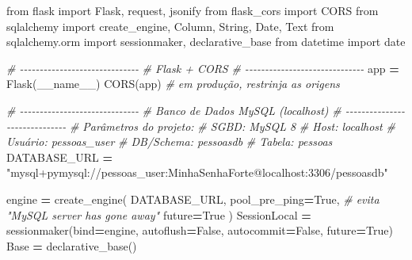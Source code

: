 \documentclass[
]{book}
\newenvironment{Shaded}{\begin{snugshade}}{\end{snugshade}}
\newcommand{\CommentTok}[1]{\textcolor[rgb]{0.56,0.35,0.01}{\textit{#1}}}
\newcommand{\ImportTok}[1]{#1}
\newcommand{\NormalTok}[1]{#1}
\newcommand{\OperatorTok}[1]{\textcolor[rgb]{0.81,0.36,0.00}{\textbf{#1}}}
\newcommand{\StringTok}[1]{\textcolor[rgb]{0.31,0.60,0.02}{#1}}
\newcommand{\VariableTok}[1]{\textcolor[rgb]{0.00,0.00,0.00}{#1}}
\begin{document}
\begin{Shaded}
\begin{Highlighting}[]
\ImportTok{from}\NormalTok{ flask }\ImportTok{import}\NormalTok{ Flask, request, jsonify}
\ImportTok{from}\NormalTok{ flask\_cors }\ImportTok{import}\NormalTok{ CORS}
\ImportTok{from}\NormalTok{ sqlalchemy }\ImportTok{import}\NormalTok{ create\_engine, Column, String, Date, Text}
\ImportTok{from}\NormalTok{ sqlalchemy.orm }\ImportTok{import}\NormalTok{ sessionmaker, declarative\_base}
\ImportTok{from}\NormalTok{ datetime }\ImportTok{import}\NormalTok{ date}

\CommentTok{\# {-}{-}{-}{-}{-}{-}{-}{-}{-}{-}{-}{-}{-}{-}{-}{-}{-}{-}{-}{-}{-}{-}{-}{-}{-}{-}{-}{-}{-}{-}}
\CommentTok{\# Flask + CORS}
\CommentTok{\# {-}{-}{-}{-}{-}{-}{-}{-}{-}{-}{-}{-}{-}{-}{-}{-}{-}{-}{-}{-}{-}{-}{-}{-}{-}{-}{-}{-}{-}{-}}
\NormalTok{app }\OperatorTok{=}\NormalTok{ Flask(}\VariableTok{\_\_name\_\_}\NormalTok{)}
\NormalTok{CORS(app)  }\CommentTok{\# em produção, restrinja as origens}

\CommentTok{\# {-}{-}{-}{-}{-}{-}{-}{-}{-}{-}{-}{-}{-}{-}{-}{-}{-}{-}{-}{-}{-}{-}{-}{-}{-}{-}{-}{-}{-}{-}}
\CommentTok{\# Banco de Dados MySQL (localhost)}
\CommentTok{\# {-}{-}{-}{-}{-}{-}{-}{-}{-}{-}{-}{-}{-}{-}{-}{-}{-}{-}{-}{-}{-}{-}{-}{-}{-}{-}{-}{-}{-}{-}}
\CommentTok{\# Parâmetros do projeto:}
\CommentTok{\#   SGBD: MySQL 8}
\CommentTok{\#   Host: localhost}
\CommentTok{\#   Usuário: pessoas\_user}
\CommentTok{\#   DB/Schema: pessoasdb}
\CommentTok{\#   Tabela: pessoas}
\NormalTok{DATABASE\_URL }\OperatorTok{=} \StringTok{"mysql+pymysql://pessoas\_user:MinhaSenhaForte@localhost:3306/pessoasdb"}

\NormalTok{engine }\OperatorTok{=}\NormalTok{ create\_engine(}
\NormalTok{    DATABASE\_URL,}
\NormalTok{    pool\_pre\_ping}\OperatorTok{=}\VariableTok{True}\NormalTok{,        }\CommentTok{\# evita "MySQL server has gone away"}
\NormalTok{    future}\OperatorTok{=}\VariableTok{True}
\NormalTok{)}
\NormalTok{SessionLocal }\OperatorTok{=}\NormalTok{ sessionmaker(bind}\OperatorTok{=}\NormalTok{engine, autoflush}\OperatorTok{=}\VariableTok{False}\NormalTok{, autocommit}\OperatorTok{=}\VariableTok{False}\NormalTok{, future}\OperatorTok{=}\VariableTok{True}\NormalTok{)}
\NormalTok{Base }\OperatorTok{=}\NormalTok{ declarative\_base()}


\end{Highlighting}
\end{Shaded}
\end{document}
